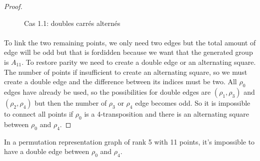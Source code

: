 \begin{proof}
\begin{figure}[H]
\begin{center}
\begin{tikzpicture}[scale=.8]
      \end{tikzpicture}
      \caption{Cas 1.1: doubles carrés alternés}
    \end{center}
  \end{figure}

  \paragraph{}
  To link the two remaining points, we only need two edges but the total amount of edge will be odd but that is fordidden because we want that the generated group is $A_{11}$. To restore parity we need to create a double edge or an alternating square. The number of points if insufficient to create an alternating square, so we must create a double edge and the difference between its indices must be two. All $\rho_0$ edges have already be used, so the possibilities for double edges are $(\rho_1, \rho_3)$ and $(\rho_2, \rho_4)$ but then the number of $\rho_3$ or $\rho_4$ edge becomes odd. So it is impossible to connect all points if $\rho_0$ is a 4-transposition and there is an alternating square between $\rho_0$ and $\rho_4$.
\end{proof}

\begin{lemma}
  \label{lemma-forbidden-double-edge}
  In a permutation representation graph of rank 5 with 11 points, it's impossible to have a double edge between $\rho_0$ and $\rho_4$.
\end{lemma}

